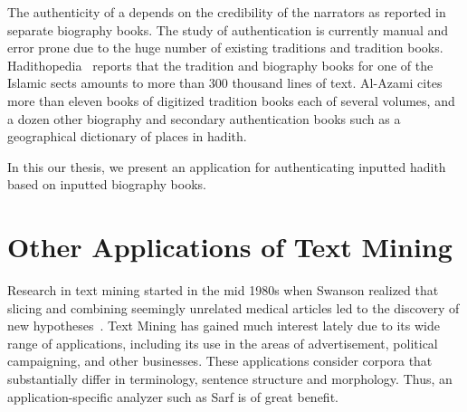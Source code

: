 \documentclass[a4,12pt]{report}
\newcommand{\noArRL}[1]{\arabfalse\RL{#1}\arabtrue}
\begin{document}
\novocalize

\transfalse
\begin{figure}[tb]
\end{figure}
\transtrue
\vocalize

The authenticity of a \noArRL{.hady_t} depends on 
the credibility of the narrators as reported in 
separate biography books. 
The study of \noArRL{.hady_t} authentication is 
currently manual and error prone due to the huge number
of existing traditions and tradition books. 
Hadithopedia~\cite{Hadithopaedia:08}
reports that the tradition and biography
books for one of the Islamic sects amounts to more than 
300 thousand lines of text. 
Al-Azami\cite{Al-Azami-91} cites more than eleven books
of digitized tradition books each of several volumes, and a dozen
other biography and secondary authentication books such
as a geographical dictionary of places in hadith. 

In this our thesis, we present an application
for authenticating inputted hadith based on inputted biography books.

\section{Other Applications of Text Mining}
\label{sec:Applications}

%

Research in text mining started in the mid 1980s when Swanson 
realized that slicing and combining seemingly unrelated medical 
articles led to the discovery of new 
hypotheses~\cite{JNi06}. 
Text Mining has gained much interest lately due to its wide range of applications,
including its use in the areas of advertisement, 
political campaigning, and other businesses.
These applications consider corpora that substantially differ in terminology, 
sentence structure and morphology. Thus, an application-specific analyzer such as Sarf is of great benefit.
\end{document}
